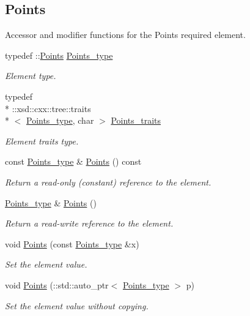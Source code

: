 \subsection*{Points}
\label{_amgrp75dd5f1160a3f02b6fae89c54361a1b3}%
Accessor and modifier functions for the Points required element. \begin{DoxyCompactItemize}
\item 
typedef \+::\hyperlink{classPoints}{Points} \hyperlink{classPieceUnstructuredGrid__t_a7747b159a3d1eee8d02a0eefaa235711}{Points\+\_\+type}
\begin{DoxyCompactList}\small\item\em Element type. \end{DoxyCompactList}\item 
typedef \\*
\+::xsd\+::cxx\+::tree\+::traits\\*
$<$ \hyperlink{classPieceUnstructuredGrid__t_a7747b159a3d1eee8d02a0eefaa235711}{Points\+\_\+type}, char $>$ \hyperlink{classPieceUnstructuredGrid__t_abdfd9c9f9eb5f43bd4cfcb2fad6d9f63}{Points\+\_\+traits}
\begin{DoxyCompactList}\small\item\em Element traits type. \end{DoxyCompactList}\item 
const \hyperlink{classPieceUnstructuredGrid__t_a7747b159a3d1eee8d02a0eefaa235711}{Points\+\_\+type} \& \hyperlink{classPieceUnstructuredGrid__t_a53dfd670cb335d13003dc229343a0fa1}{Points} () const 
\begin{DoxyCompactList}\small\item\em Return a read-\/only (constant) reference to the element. \end{DoxyCompactList}\item 
\hyperlink{classPieceUnstructuredGrid__t_a7747b159a3d1eee8d02a0eefaa235711}{Points\+\_\+type} \& \hyperlink{classPieceUnstructuredGrid__t_aa8e21b391979e8e2e22361e3b29e0276}{Points} ()
\begin{DoxyCompactList}\small\item\em Return a read-\/write reference to the element. \end{DoxyCompactList}\item 
void \hyperlink{classPieceUnstructuredGrid__t_ab653af7be8fbe0d3458bf8cd5cdf3668}{Points} (const \hyperlink{classPieceUnstructuredGrid__t_a7747b159a3d1eee8d02a0eefaa235711}{Points\+\_\+type} \&x)
\begin{DoxyCompactList}\small\item\em Set the element value. \end{DoxyCompactList}\item 
void \hyperlink{classPieceUnstructuredGrid__t_a3a44ef2850c664e89d79075a51497b17}{Points} (\+::std\+::auto\+\_\+ptr$<$ \hyperlink{classPieceUnstructuredGrid__t_a7747b159a3d1eee8d02a0eefaa235711}{Points\+\_\+type} $>$ p)
\begin{DoxyCompactList}\small\item\em Set the element value without copying. \end{DoxyCompactList}\end{DoxyCompactItemize}
